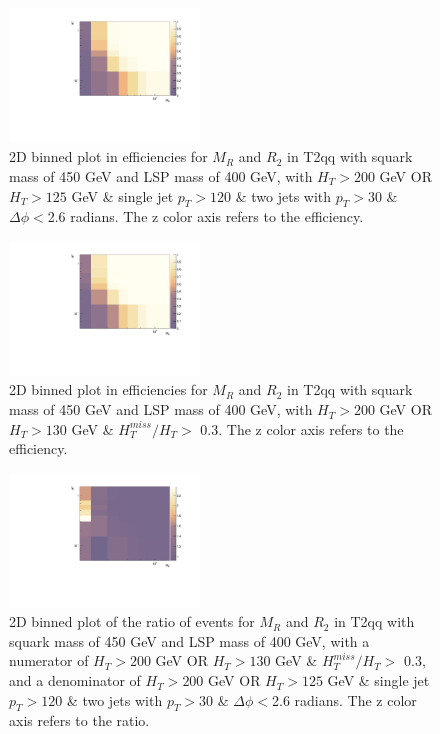 \documentclass[twocolumn,aps,prd,reprint]{revtex4-1}
\begin{document}
\begin{figure}[h]
 \includegraphics[width=0.45\textwidth]{newtrigger_OR_ht200_file2.pdf}
\caption{\label{fig:comp} 2D binned plot in efficiencies for $M_R$ and $R_2$ in T2qq with squark mass of 450 GeV and LSP mass of 400 GeV, with $H_T>200$ GeV OR  $H_T>125$ GeV \& single jet $p_T>120$ \& two jets with $p_T>30$ \& $\Delta\phi<$2.6 radians. The z color axis refers to the efficiency.}
\end{figure}
\begin{figure}[h]
 \includegraphics[width=0.45\textwidth]{ht130_MHT_HT_0_3_OR_ht200_file2.pdf}
\caption{\label{fig:at} 2D binned plot in efficiencies for $M_R$ and $R_2$ in T2qq with squark mass of 450 GeV and LSP mass of 400 GeV, with $H_T>200$ GeV OR  $H_T>130$ GeV \& $H_T^{miss}/H_T >$ 0.3. The z color axis refers to the efficiency.}
\end{figure}
\begin{figure}
 \includegraphics[width=0.45\textwidth]{ratio_MHTHT_vs_new_trigger_file2.pdf}
\caption{\label{fig:ratio_at} 2D binned plot of the ratio of events for $M_R$ and $R_2$ in T2qq with squark mass of 450 GeV and LSP mass of 400 GeV, with a numerator of $H_T>200$ GeV OR  $H_T>130$ GeV \& $H_T^{miss}/H_T >$ 0.3, and a denominator of $H_T>200$ GeV OR  $H_T>125$ GeV \& single jet $p_T>120$ \& two jets with $p_T>30$ \& $\Delta\phi<$2.6 radians. The z color axis refers to the ratio.}
\end{figure}
\end{document}
